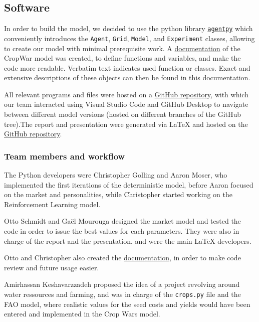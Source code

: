 \documentclass[a4paper,12pt]{article} %
\begin{document}
\subsection{Software}
In order to build the model, we decided to use the python library \href{https://agentpy.readthedocs.io/en/stable/overview.html}{\texttt{agentpy}} which conveniently introduces the \texttt{Agent}, \texttt{Grid}, \texttt{Model}, and \texttt{Experiment} classes, allowing to create our model with minimal prerequisite work. A \href{https://n.ethz.ch/~cgolling/gess/html/index.html}{documentation} of the CropWar model was created, to define functions and variables, and make the code more readable. Verbatim text indicates used function or classes. Exact and extensive descriptions of these objects can then be found in this documentation.

All relevant programs and files were hosted on a \href{https://github.com/Anon75014/AgentBasedModelling}{GitHub repository}, with which our team interacted using Visual Studio Code and GitHub Desktop to navigate between different model versions (hosted on different branches of the GitHub tree).The report and presentation were generated via LaTeX and hosted on the \href{https://github.com/Anon75014/AgentBasedModelling}{GitHub repository}.

\subsubsection{Team members and workflow}

The Python developers were Christopher Golling and Aaron Moser, who implemented the first iterations of the deterministic model, before Aaron focused on the market and personalities, while Christopher started working on the Reinforcement Learning model.

Otto Schmidt and Ga\"el Mourouga designed the market model and tested the code in order to issue the best values for each parameters. They were also in charge of the report and the presentation, and were the main LaTeX developers.

Otto and Christopher also created the \href{https://n.ethz.ch/~cgolling/gess/html/index.html}{documentation}, in order to make code review and future usage easier.

Amirhassan Keshavarzzadeh proposed the idea of a project revolving around water ressources and farming, and was in charge of the \texttt{crops.py} file and the FAO model, where realistic values for the seed costs and yields would have been entered and implemented in the Crop Wars model.
\end{document}
